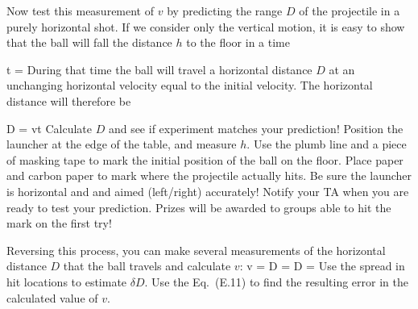 


\item Now test this measurement  of $v$ by predicting the
range $D$ of the projectile in a purely horizontal
shot.
If we consider only the
vertical motion, it is easy to show that the ball will fall the
distance $h$ to the floor in a time

\beq
t = 
\eeq
During that time the ball will
travel a horizontal distance $D$ at an unchanging horizontal
velocity equal to the initial velocity.  The horizontal  distance will therefore be

\beq
D = vt 
\eeq
Calculate $D$ and see if experiment matches your prediction!
Position
the launcher at the edge of the table, and  measure $h$.  Use the
plumb line and a piece of masking tape to mark the initial position of
the ball on the floor.  Place paper and carbon paper to mark
where the projectile actually hits. Be sure the launcher is horizontal and 
and aimed (left/right) accurately!
Notify your TA when you are ready to test
your prediction.  Prizes will be awarded to groups able to hit the mark
on the first try!

\item Reversing this process, you can make
several measurements of the horizontal distance $D$ that the ball
travels and calculate $v$:
\beq
v = {D\over {}} = D  =
\eeq
Use the spread in hit locations to estimate $\delta D$.
Use the Eq.~(E.11) to find the resulting error in the calculated value of
$v$.


